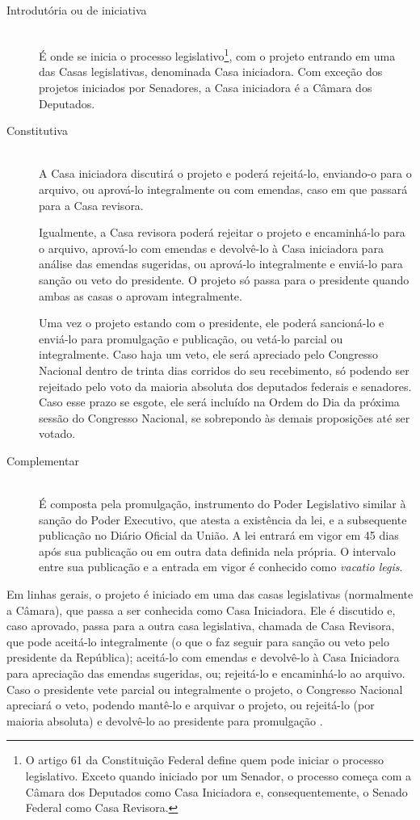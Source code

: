 \documentclass[a4paper,titlepage]{ppgi}\usepackage[]{graphicx}\usepackage[]{color}
\begin{document}
\begin{description}
\item[Introdutória ou de iniciativa] \hfill \\
É onde se inicia o processo legislativo\footnote{O artigo 61 da Constituição
Federal define quem pode iniciar o processo legislativo. Exceto quando iniciado
por um Senador, o processo começa com a Câmara dos Deputados como Casa
Iniciadora e, consequentemente, o Senado Federal como Casa Revisora.}, com o
projeto entrando em uma das Casas legislativas, denominada Casa iniciadora. Com
exceção dos projetos iniciados por Senadores, a Casa iniciadora é a Câmara dos
Deputados.

\item[Constitutiva] \hfill \\
A Casa iniciadora discutirá o projeto e poderá rejeitá-lo, enviando-o para o
arquivo, ou aprová-lo integralmente ou com emendas, caso em que passará para a
Casa revisora.

Igualmente, a Casa revisora poderá rejeitar o projeto e encaminhá-lo para o
arquivo, aprová-lo com emendas e devolvê-lo à Casa iniciadora para análise das
emendas sugeridas, ou aprová-lo integralmente e enviá-lo para sanção ou veto do
presidente. O projeto só passa para o presidente quando ambas as casas o
aprovam integralmente.

Uma vez o projeto estando com o presidente, ele poderá sancioná-lo e enviá-lo
para promulgação e publicação, ou vetá-lo parcial ou integralmente. Caso haja
um veto, ele será apreciado pelo Congresso Nacional dentro de trinta dias
corridos do seu recebimento, só podendo ser rejeitado pelo voto da maioria
absoluta dos deputados federais e senadores. Caso esse prazo se esgote, ele
será incluído na Ordem do Dia da próxima sessão do Congresso Nacional, se
sobrepondo às demais proposições até ser votado.

\item[Complementar] \hfill \\
É composta pela promulgação, instrumento do Poder Legislativo similar à
sanção do Poder Executivo, que atesta a existência da lei, e a subsequente
publicação no Diário Oficial da União. A lei entrará em vigor em 45 dias após
sua publicação ou em outra data definida nela própria. O intervalo entre sua
publicação e a entrada em vigor é conhecido como \emph{vacatio legis}.
\end{description}

Em linhas gerais, o projeto é iniciado em uma das casas legislativas
(normalmente a Câmara), que passa a ser conhecida como Casa Iniciadora. Ele é
discutido e, caso aprovado, passa para a outra casa legislativa, chamada de
Casa Revisora, que pode aceitá-lo integralmente (o que o faz seguir para sanção
ou veto pelo presidente da República); aceitá-lo com emendas e devolvê-lo à
Casa Iniciadora para apreciação das emendas sugeridas, ou; rejeitá-lo e
encaminhá-lo ao arquivo. Caso o presidente vete parcial ou integralmente o
projeto, o Congresso Nacional apreciará o veto, podendo mantê-lo e arquivar o
projeto, ou rejeitá-lo (por maioria absoluta) e devolvê-lo ao presidente para
promulgação \cite{Carneiro2013}.
\end{document}
